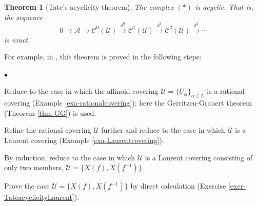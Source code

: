 \documentclass[a4paper,12pt, dvipdfmx]{jsbook}
\renewenvironment{itemize}%
{%
   \begin{list}{\parbox{1zw}{$\bullet$}}%
   {%
      \setlength{\topsep}{.5zh}
      \setlength{\itemindent}{0zw}
      \setlength{\leftmargin}{3zw}%
      \setlength{\rightmargin}{0zw}%
      \setlength{\labelsep}{.5zw}%
      \setlength{\labelwidth}{3zw}%
      \setlength{\itemsep}{0.2em}%
      \setlength{\parsep}{0em}%
      \setlength{\listparindent}{0zw}%
   }
}{%
   \end{list}%
}
\theoremstyle{plain}
\newtheorem{thm}{\bfseries Theorem}[section]
\theoremstyle{definition}
\begin{document}
\begin{thm}[Tate's acyclicity theorem]\label{thm-Tateacyclicity}{\rm 
The complex $(\ast)$ is acyclic.
That is, the sequence
$$
0\longrightarrow\mathcal{A}\longrightarrow\mathscr{C}^0(\mathcal{U})\stackrel{d^0}{\longrightarrow}\mathscr{C}^1(\mathcal{U})\stackrel{d^1}{\longrightarrow}\mathscr{C}^2(\mathcal{U})\stackrel{d^2}{\longrightarrow}\cdots
$$
is exact.}
\end{thm}

For example, in \cite[\S8.2]{BGR}, this theorem is proved in the following steps:
\begin{itemize}
\item Reduce to the case in which the affinoid covering $\mathcal{U}=\{U_{\alpha}\}_{\alpha\in L}$ is a rational covering (Example \ref{exa-rationalcovering}); here the Gerritzen-Grauert theorem (Theorem \ref{thm-GG}) is used.
\item Refine the rational covering $\mathcal{U}$ further and reduce to the case in which $\mathcal{U}$ is a Laurent covering (Example \ref{exa-Laurentcovering}).
\item By induction, reduce to the case in which $\mathcal{U}$ is a Laurent covering consisting of only two members, $\mathcal{U}=\{X(f),X(f^{-1})\}$.
\item Prove the case $\mathcal{U}=\{X(f),X(f^{-1})\}$ by direct calculation (Exercise \ref{exer-TateacyclicityLaurent}).
\end{itemize}
\end{document}
